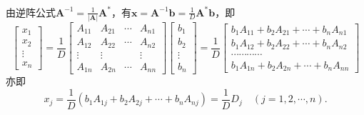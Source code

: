 \paragraph{}
由逆阵公式$\bm{A}^{-1}=\frac{1}{|\bm{A}|}\bm{A}^*$，有$\bm{x}=\bm{A}^{-1}\bm{b}=\frac{1}{D}\bm{A}^*\bm{b}$，即
\begin{equation*}
  \left[\begin{array}{c}
    x_1 \\
    x_2 \\
    \vdots \\
    x_n
  \end{array}\right] = \frac{1}{D}
  \left[\begin{array}{cccc}
    A_{11} & A_{21} & \cdots & A_{n1} \\
    A_{12} & A_{22} & \cdots & A_{n2} \\
    \vdots & \vdots & & \vdots \\
    A_{1n} & A_{2n} & \cdots & A_{nn}
  \end{array}\right]
  \left[\begin{array}{c}
    b_1 \\
    b_2 \\
    \vdots \\
    b_n
  \end{array}\right] = \frac{1}{D}
  \left[\begin{array}{c}
    b_1A_{11} + b_2A_{21} + \cdots + b_nA_{n1} \\
    b_1A_{12} + b_2A_{22} + \cdots + b_nA_{n2} \\
    \cdots\cdots\cdots\cdots \\
    b_1A_{1n} + b_2A_{2n} + \cdots + b_nA_{nn}
  \end{array}\right]
\end{equation*}
亦即
\begin{equation*}
  x_j = \frac{1}{D}(b_1A_{1j}+b_2A_{2j}+\cdots+b_nA_{nj}) = \frac{1}{D}D_j \quad (j=1,2,\cdots,n).
\end{equation*}
